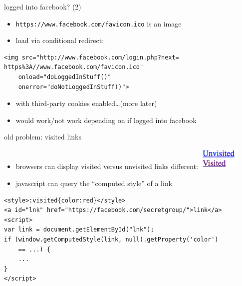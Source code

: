 \begin{frame}[fragile,label=inFB2]{logged into facebook? (2)}
    \begin{itemize}
        \item \texttt{https://www.facebook.com/favicon.ico} is an image
        \item load via conditional redirect:
    \end{itemize}
    \begin{verbatim}
<img src="http://www.facebook.com/login.php?next= https%3A//www.facebook.com/favicon.ico"
    onload="doLoggedInStuff()"
    onerror="doNotLoggedInStuff()">
\end{verbatim}
    \begin{itemize}
    \item with third-party cookies enabled\ldots (more later)
    \item would work/not work depending on if logged into facebook
    \end{itemize}
\end{frame}


\begin{frame}[fragile,label=visitedLinks]{old problem: visited links}
    \begin{itemize}
    \item browsers can display visited versus unvisited links different:
        \includegraphics[width=2cm]{../web/visitedunvisited}
    \item javascript can query the ``computed style'' of a link
    \end{itemize}
\begin{verbatim}
<style>:visited{color:red}</style>
<a id="lnk" href="https://facebook.com/secretgroup/">link</a>
<script>
var link = document.getElementById("lnk");
if (window.getComputedStyle(link, null).getProperty('color')
    == ...) {
    ...
}
</script>
\end{verbatim}
\end{frame}

